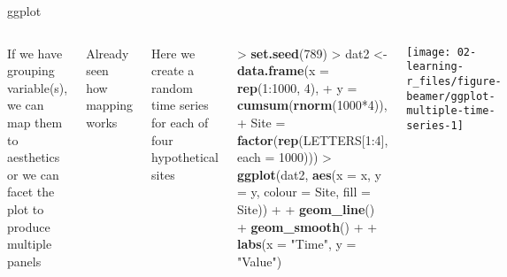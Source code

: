 \documentclass[10pt,ignorenonframetext,compress, aspectratio=169]{beamer}
\newenvironment{Shaded}{\begin{snugshade}}{\end{snugshade}}
\newcommand{\KeywordTok}[1]{\textcolor[rgb]{0.13,0.29,0.53}{\textbf{{#1}}}}
\newcommand{\DataTypeTok}[1]{\textcolor[rgb]{0.13,0.29,0.53}{{#1}}}
\newcommand{\DecValTok}[1]{\textcolor[rgb]{0.00,0.00,0.81}{{#1}}}
\newcommand{\StringTok}[1]{\textcolor[rgb]{0.31,0.60,0.02}{{#1}}}
\newcommand{\NormalTok}[1]{{#1}}
\newcommand{\columnsbegin}{\begin{columns}}
\newcommand{\columnsend}{\end{columns}}
\begin{document}
\begin{frame}[fragile]{ggplot}

\columnsbegin
{}

If we have grouping variable(s), we can map them to aesthetics or we can
\alert{facet} the plot to produce multiple panels

Already seen how mapping works

Here we create a random time series for each of four hypothetical sites


\begin{Shaded}
\begin{Highlighting}[]
\NormalTok{>}\StringTok{ }\KeywordTok{set.seed}\NormalTok{(}\DecValTok{789}\NormalTok{)}
\NormalTok{>}\StringTok{ }\NormalTok{dat2 <-}\StringTok{ }\KeywordTok{data.frame}\NormalTok{(}\DataTypeTok{x =} \KeywordTok{rep}\NormalTok{(}\DecValTok{1}\NormalTok{:}\DecValTok{1000}\NormalTok{, }\DecValTok{4}\NormalTok{),}
\NormalTok{+}\StringTok{                    }\DataTypeTok{y =} \KeywordTok{cumsum}\NormalTok{(}\KeywordTok{rnorm}\NormalTok{(}\DecValTok{1000}\NormalTok{*}\DecValTok{4}\NormalTok{)),}
\NormalTok{+}\StringTok{                    }\DataTypeTok{Site =} \KeywordTok{factor}\NormalTok{(}\KeywordTok{rep}\NormalTok{(LETTERS[}\DecValTok{1}\NormalTok{:}\DecValTok{4}\NormalTok{], }\DataTypeTok{each =} \DecValTok{1000}\NormalTok{)))}
\NormalTok{>}\StringTok{ }\KeywordTok{ggplot}\NormalTok{(dat2, }\KeywordTok{aes}\NormalTok{(}\DataTypeTok{x =} \NormalTok{x, }\DataTypeTok{y =} \NormalTok{y, }\DataTypeTok{colour =} \NormalTok{Site, }\DataTypeTok{fill =} \NormalTok{Site)) +}
\NormalTok{+}\StringTok{     }\KeywordTok{geom_line}\NormalTok{() +}\StringTok{ }\KeywordTok{geom_smooth}\NormalTok{() +}
\NormalTok{+}\StringTok{     }\KeywordTok{labs}\NormalTok{(}\DataTypeTok{x =} \StringTok{"Time"}\NormalTok{, }\DataTypeTok{y =} \StringTok{"Value"}\NormalTok{)}
\end{Highlighting}
\end{Shaded}

\begin{center}\texttt{[image: 02-learning-r\_files/figure-beamer/ggplot-multiple-time-series-1]} \end{center}

\columnsend

\end{frame}
\end{document}
